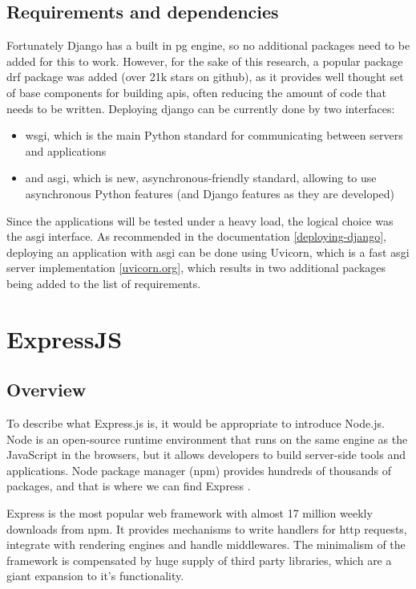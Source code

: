 \subsection{Requirements and dependencies}
Fortunately Django has a built in \acrlong{pg} engine, so no additional packages need to be added for this to work. However, for the sake of this research, a popular package \acrlong{drf} package was added (over 21k stars on github), as it provides well thought set of base components for building \acrshort{api}s, often reducing the amount of code that needs to be written.
Deploying django can be currently done by two interfaces:
\begin{itemize}
    \item \acrshort{wsgi}, which is the main Python standard for communicating between servers and applications
    \item and \acrshort{asgi}, which is new, asynchronous-friendly standard, allowing to use asynchronous Python features (and Django features as they are developed) \cite{deployingDjango}
\end{itemize}

Since the applications will be tested under a heavy load, the logical choice was the \acrshort{asgi} interface. As recommended in the documentation \ref{deploying-django}, deploying an application with \acrshort{asgi} can be done using Uvicorn, which is a fast \acrshort{asgi} server implementation \ref{uvicorn.org}, which results in two additional packages being added to the list of requirements.

\section{ExpressJS}

\subsection{Overview}

To describe what Express.js is, it would be appropriate to introduce Node.js. Node is an open-source runtime environment that runs on the same engine as the JavaScript in the browsers, but it allows developers to build server-side tools and applications. Node package manager (\acrshort{npm}) provides hundreds of thousands of packages, and that is where we can find Express \cite{expressIntroduction}.

Express is the most popular web framework with almost 17 million weekly downloads from \acrshort{npm}. It provides mechanisms to write handlers for \acrshort{http} requests, integrate with rendering engines and handle middlewares. The minimalism of the framework is compensated by huge supply of third party libraries, which are a giant expansion to it's functionality.

